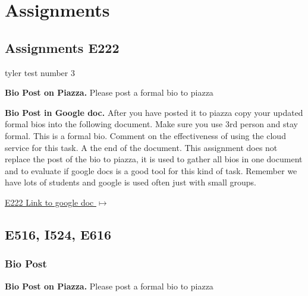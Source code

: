 

\chapter{Assignments}\label{c:assignments}

\section{Assignments E222}\label{s:e222-assignment}
\label{s:e222-assignments}

tyler test number 3

\begin{exercise}\label{E:bio-piazza}
{\bf Bio Post on Piazza.} Please post a formal bio to piazza
\end{exercise}
 
\begin{exercise} \label{E:bio-googledocs}

 {\bf Bio Post in Google doc.} After you have posted it to piazza copy your updated formal bios into the following document.  Make sure you use 3rd person and stay formal. This is a formal bio. Comment on the effectiveness of using the cloud service for this task. A the end of the document. This assignment does not replace the post of the bio to piazza, it is used to gather all bios in one document and to evaluate if google docs is a good tool for this kind of task. Remember we have lots of students and google is used often just with small groups.
 
 \smallskip

 {\hfill \href{https://docs.google.com/document/d/1ejzlKYqC3dLac8WXVpcPQsJh1j4BDqRxxgGg1cFQbeQ/edit?usp=sharing}{E222 Link to google doc $\mapsto$}}

 \end{exercise}


\section{E516, I524, E616}
\label{s:e516/524/616-assignments}

\subsection{Bio Post}\label{a:616-bio}

\begin{exercise}\label{E:bio-piazza}
{\bf Bio Post on Piazza.} Please post a formal bio to piazza
\end{exercise}

